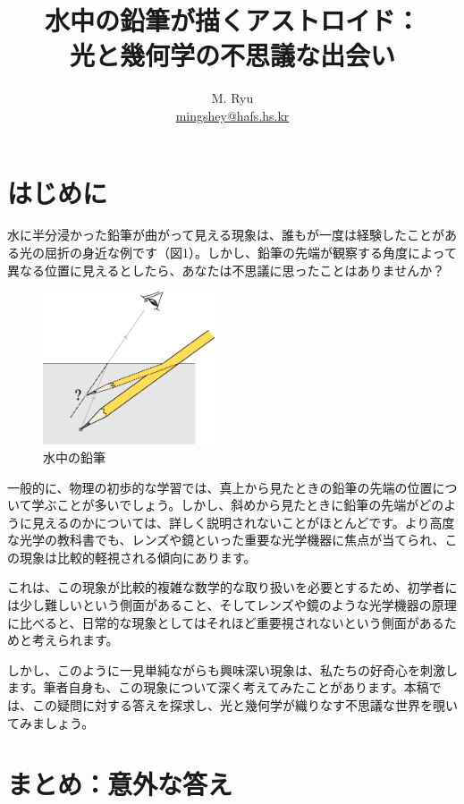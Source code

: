\documentclass[twocolumn]{article}
\title{水中の鉛筆が描くアストロイド：\\光と幾何学の不思議な出会い}
\author{M. Ryu \\ {\href{mailto:mingshey@hafs.hs.kr}{mingshey@hafs.hs.kr}}}
\begin{document}
	\maketitle
	\newcommand{\romana}{{a}}
	\newcommand{\romanb}{{b}}
	\newcommand{\romanA}{{A}}
	\newcommand{\romanB}{{B}}
	\newcommand{\greeka}{{\alpha}}
	\newcommand{\greekb}{{\beta}}
	\newcommand{\Aprime}{{A^{\prime}}}
	\newcommand{\Bprime}{{B^{\prime}}}
	\renewcommand{\figurename}{図}
	\section{はじめに}
	
	水に半分浸かった鉛筆が曲がって見える現象は、誰もが一度は経験したことがある光の屈折の身近な例です（図1）。しかし、鉛筆の先端が観察する角度によって異なる位置に見えるとしたら、あなたは不思議に思ったことはありませんか？
	
	\begin{figure}[ht]
		\centering
		\includegraphics[width=2in]{figs/g164.eps}
		\caption{水中の鉛筆}
		\label{fig:pencil}
	\end{figure}
	
	一般的に、物理の初歩的な学習では、真上から見たときの鉛筆の先端の位置について学ぶことが多いでしょう。しかし、斜めから見たときに鉛筆の先端がどのように見えるのかについては、詳しく説明されないことがほとんどです。より高度な光学の教科書でも、レンズや鏡といった重要な光学機器に焦点が当てられ、この現象は比較的軽視される傾向にあります。
	
	これは、この現象が比較的複雑な数学的な取り扱いを必要とするため、初学者には少し難しいという側面があること、そしてレンズや鏡のような光学機器の原理に比べると、日常的な現象としてはそれほど重要視されないという側面があるためと考えられます。
	
	しかし、このように一見単純ながらも興味深い現象は、私たちの好奇心を刺激します。筆者自身も、この現象について深く考えてみたことがあります。本稿では、この疑問に対する答えを探求し、光と幾何学が織りなす不思議な世界を覗いてみましょう。
	
	\section{まとめ：意外な答え}
	
\end{document}
